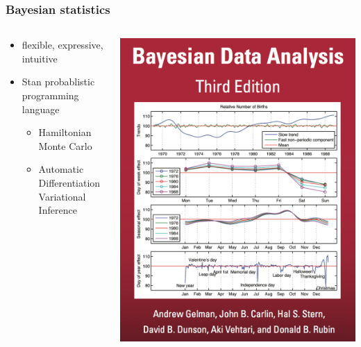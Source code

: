 \documentclass{beamer}
\begin{document}
\begin{frame}
  \frametitle{Bayesian statistics}

  \begin{columns}
    \begin{column}{0.5\textwidth}
      \begin{itemize}
        \item flexible, expressive, intuitive
        \item Stan probablistic programming language
          \begin{itemize}
            \item Hamiltonian Monte Carlo
            \item Automatic Differentiation Variational Inference
          \end{itemize}
      \end{itemize}
    \end{column}
    \begin{column}{0.5\textwidth}
      \begin{center}
        \includegraphics[width = \textwidth,height = 0.8\textheight,keepaspectratio = true]{figure/bda_cover}
      \end{center}
    \end{column}
  \end{columns}
\end{frame}
\end{document}
